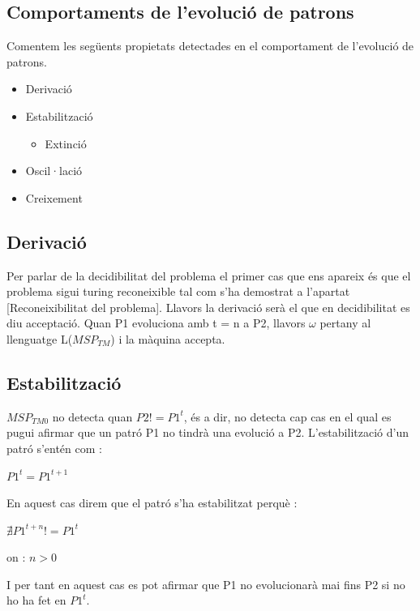 \documentclass[12pt,a4paper]{report}
\def \w{$\omega$}
\def \tm{$MSP_{TM} $}
\def \tmz{$MSP_{TM0} $}
\begin{document}
\subsection{Comportaments de l’evolució de patrons}

Comentem les següents propietats detectades en el comportament de l’evolució de patrons.

\begin{itemize}
\item Derivació
\item Estabilització
	\begin{itemize}
	\item Extinció
	\end{itemize}
\item Oscil·lació
\item Creixement
\end{itemize}

\subsection{Derivació}

Per parlar de la decidibilitat del problema el primer cas que ens apareix és que el problema sigui turing reconeixible tal com s’ha demostrat a l’apartat [Reconeixibilitat del problema]. Llavors la derivació serà el que en decidibilitat es diu acceptació. Quan P1 evoluciona amb t = n a P2, llavors \w{} pertany al llenguatge L(\tm{}) i la màquina accepta.

\subsection{Estabilització}

\tmz{} no detecta quan $P2 != P1^t$, és a dir, no detecta cap cas en el qual es pugui afirmar que un patró P1 no tindrà una evolució a P2. L’estabilització d’un patró s’entén com :

\begin{center}
$P1^t = P1^{t+1}$
\end{center}

En aquest cas direm que el patró s’ha estabilitzat perquè :

\begin{center}
$\nexists P1^{t+n} != P1^t$
\end{center}

on : $n > 0$

I per tant en aquest cas es pot afirmar que P1 no evolucionarà mai fins P2 si no ho ha fet en $P1^t$.
\end{document}
